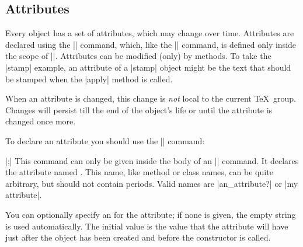 \subsection{Attributes}

Every object has a set of attributes, which may change over
time. Attributes are declared using the |\attribute| command, which,
like the |\method| command, is defined only inside the scope of
|\pgfooclass|. Attributes can be modified (only) by methods. To take
the |stamp| example, an attribute of a |stamp| object might be the
text that should be stamped when the |apply| method is called.

When an attribute is changed, this change is \emph{not} local to the
current \TeX\ group. Changes will persist till the end
of the object's life or until the attribute is changed once more.

To declare an attribute you should use the |\attribute| command:
\begin{command}{\attribute {}|;|}
  This command can only be given inside the body of an |\pgfooclass|
  command. It declares the attribute named . This
  name, like method or class names, can be quite arbitrary, but should
  not contain periods. Valid names are |an_attribute?| or
  |my attribute|.

  You can optionally specify an  for the
  attribute; if none is given, the empty string is used
  automatically. The initial value is the value that the attribute
  will have just after the object has been created and before the
  constructor is called.  

\begin{codeexample}
\end{codeexample}
\end{command}

